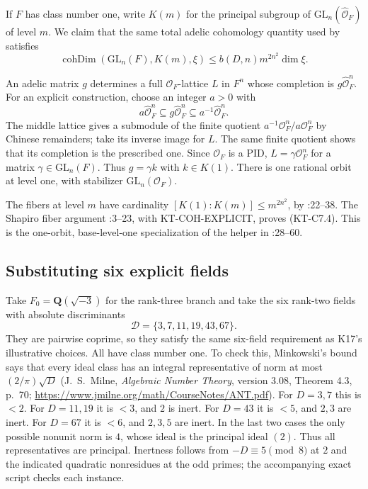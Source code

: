 If $F$ has class number one, write $K(m)$ for the principal subgroup
of $\mathrm{GL}_n(\widehat{\mathcal O}_F)$ of level $m$.  We claim that
the same total adelic cohomology quantity used by 
satisfies
\[
 \operatorname{cohDim}(\mathrm{GL}_n(F),K(m),\xi)
 \le b(D,n)m^{2n^2}\dim\xi.
\tag{KT-C7.4}
\]

An adelic matrix $g$ determines a full $\mathcal O_F$-lattice $L$ in
$F^n$ whose completion is $g\widehat{\mathcal O}_F^n$.
For an explicit construction, choose an integer $a>0$ with
\[
 a\widehat{\mathcal O}_F^n\subseteq
 g\widehat{\mathcal O}_F^n\subseteq
 a^{-1}\widehat{\mathcal O}_F^n.
\]
The middle lattice gives a submodule of the finite quotient
$a^{-1}\mathcal O_F^n/a\mathcal O_F^n$ by Chinese remainders; take
its inverse image for $L$.  The same finite quotient shows that its
completion is the prescribed one.  Since $\mathcal O_F$ is a PID,
$L=\gamma\mathcal O_F^n$ for a matrix $\gamma\in\mathrm{GL}_n(F)$.
Thus $g=\gamma k$ with $k\in K(1)$.
There is one rational orbit at level one, with stabilizer
$\mathrm{GL}_n(\mathcal O_F)$.

The fibers at level $m$ have cardinality
$[K(1):K(m)]\le m^{2n^2}$, by
:22--38.
The Shapiro fiber argument
:3--23,
with KT-COH-EXPLICIT, proves (KT-C7.4).
This is the one-orbit, base-level-one specialization of the helper
 in :28--60.

\subsection{Substituting six explicit fields}

Take $F_0=\mathbf Q(\sqrt{-3})$ for the rank-three branch and take
the six rank-two fields with absolute discriminants
\[
 \mathcal D=\{3,7,11,19,43,67\}.
\]
They are pairwise coprime, so they satisfy the same six-field
requirement as K17's illustrative choices.
All have class number one.  To check this, Minkowski's bound says
that every ideal class has an integral representative of norm at
most $(2/\pi)\sqrt D$ (J.~S.~Milne,
\emph{Algebraic Number Theory}, version 3.08, Theorem 4.3, p.~70;
\url{https://www.jmilne.org/math/CourseNotes/ANT.pdf}).
For $D=3,7$ this is $<2$.  For $D=11,19$ it is $<3$, and $2$ is
inert.  For $D=43$ it is $<5$, and $2,3$ are inert.  For $D=67$ it
is $<6$, and $2,3,5$ are inert.  In the last two cases the only
possible nonunit norm is $4$, whose ideal is the principal ideal
$(2)$.  Thus all representatives are principal.  Inertness follows
from $-D\equiv5\pmod8$ at $2$ and the indicated quadratic
nonresidues at the odd primes; the accompanying exact script checks
each instance.

